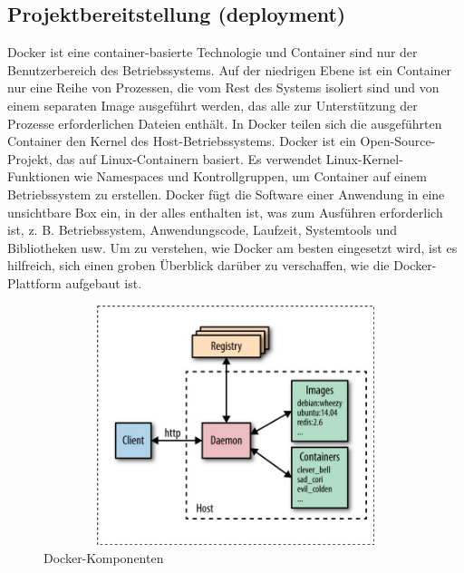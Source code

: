 \documentclass[a4paper,12pt,oneside]{book}
\begin{document}
\subsection{Projektbereitstellung (deployment)}
Docker ist eine container-basierte Technologie und Container sind nur der Benutzerbereich des Betriebssystems. Auf der niedrigen Ebene ist ein Container nur eine Reihe von Prozessen, die vom Rest des Systems isoliert sind und von einem separaten Image ausgeführt werden, das alle zur Unterstützung der Prozesse erforderlichen Dateien enthält. In Docker teilen sich die ausgeführten Container den Kernel des Host-Betriebssystems. Docker ist ein Open-Source-Projekt, das auf Linux-Containern basiert. Es verwendet Linux-Kernel-Funktionen wie Namespaces und Kontrollgruppen, um Container auf einem Betriebssystem zu erstellen. Docker fügt die Software einer Anwendung in eine unsichtbare Box ein, in der alles enthalten ist, was zum Ausführen erforderlich ist, z. B. Betriebssystem, Anwendungscode, Laufzeit, Systemtools und Bibliotheken usw.
\newline
Um zu verstehen, wie Docker am besten eingesetzt wird, ist es hilfreich, sich einen groben Überblick darüber zu verschaffen, wie die Docker-Plattform aufgebaut ist.
\begin{figure}[h!]
	\begin{center}
		\includegraphics[width=13cm, height=7cm]{Docker-components.jpg}
		\caption{Docker-Komponenten} 
		\label{Docker-Komponenten} 
	\end{center}
\end{figure}
\end{document}
